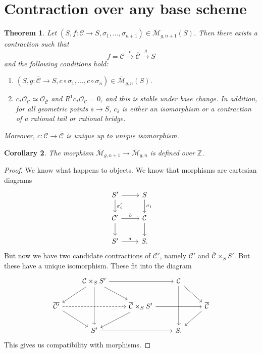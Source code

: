 \documentclass[leqno, openany]{memoir}
\newtheorem{thm}{Theorem}[section]
\newtheorem{cor}[thm]{Corollary}
\theoremstyle{definition}
\theoremstyle{remark}
\theoremstyle{plain}
\theoremstyle{definition}
\theoremstyle{remark}
\newcommand{\Z}{\mathbb{Z}}
\newcommand{\mc}[1]{\mathcal{#1}}
\newcommand{\ol}[1]{\overline{#1}}
\begin{document}
\section{Contraction over any base scheme}%
\label{sec:contraction_over_any_base_scheme}

\begin{thm}
    Let $(S, f \colon \mc{C} \to S, \sigma_1, \ldots, \sigma_{n+1}) \in \ol{\mc{M}}_{g, n+1}(S)$. Then there exists a contraction such that
    \[ f = \mc{C} \xrightarrow{c} \ol{\mc{C}} \xrightarrow{g} S \]
    and the following conditions hold:
    \begin{enumerate}
        \item $(S, g \colon \ol{\mc{C}} \to S, c \circ \sigma_1, \ldots, c \circ \sigma_n) \in \ol{\mc{M}}_{g, n}(S)$.
        \item $c_* \mc{O}_{\mc{C}} \simeq \mc{O}_{\ol{\mc{C}}}$ and $R^1 c_* \mc{O}_{\mc{C}} = 0$, and this is stable under base change. In addition, for all geometric points $\ol{s} \to S$, $c_{\ol{s}}$ is either an isomorphism or a contraction of a rational tail or rational bridge.
    \end{enumerate}
    Moreover, $c \colon \mc{C} \to \ol{\mc{C}}$ is unique up to unique isomorphism.
\end{thm}

\begin{cor}
    The morphism $\ol{\mc{M}}_{g, n+1} \to \ol{\mc{M}}_{g, n}$ is defined over $\Z$.
\end{cor}

\begin{proof}
    We know what happens to objects. We know that morphisms are cartesian diagrams
    \begin{equation*}
    \begin{tikzcd}
        S' \ar{r} \ar{d}{\sigma_i'} & S \ar{d}{\sigma_i} \\
        \mc{C}' \ar{r}{b} \ar{d} & \mc{C} \ar{d} \\
        S' \ar{r}{a} & S.
    \end{tikzcd}
    \end{equation*}
    But now we have two candidate contractions of $\mc{C}'$, namely $\ol{\mc{C}'}$ and $\ol{\mc{C}} \times_S S'$. But these have a unique isomorphism. These fit into the diagram
    \begin{equation*}
    \begin{tikzcd}
        & \mc{C} \times_S S' \ar{rr} \ar{dl} \ar{dr} \ar{dd} & & \mc{C} \ar{dr} \ar{dd} \\
        \ol{\mc{C}'} \ar{dr} \ar[dashrightarrow]{rr} & & \ol{\mc{C}} \times_S S' \ar{dl} \ar{rr} & & \ol{\mc{C}} \ar{dl} \\
        & S' \ar{rr} & & S.
    \end{tikzcd}
    \end{equation*}
    This gives us compatibility with morphisms.
\end{proof}
\end{document}
